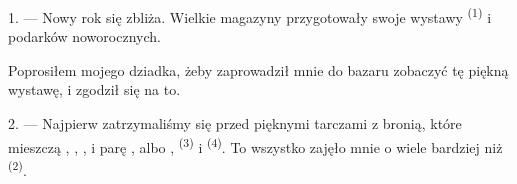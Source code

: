 %
%
%

\VUsaut{4.0mm}
\VUsaut{2.0mm}
\VUsaut{3.4mm}

1. --- Nowy rok się zbliża. Wielkie magazyny przygotowały swoje wystawy 
\textsuperscript{(1)} i podarków noworocznych.

Poprosiłem mojego dziadka, żeby zaprowadził mnie do bazaru zobaczyć tę piękną wystawę, i
zgodził się na to.

2. --- Najpierw zatrzymaliśmy się przed pięknymi tarczami z bronią, które mieszczą
, , ,  i parę
, albo ,  \textsuperscript{(3)} i
 \textsuperscript{(4)}. To wszystko zajęło mnie o wiele bardziej niż
 \textsuperscript{(2)}.

\VUsaut{3.0mm}
\VUsaut{2.6mm}


